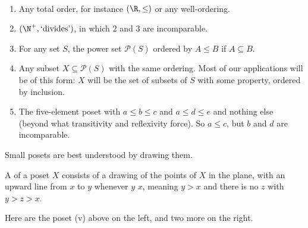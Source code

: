 \begin{example}[Posets]~
  \begin{enumerate}[label=(\roman*)]
    \item Any total order, for instance $(\R, \leq)$ or any well-ordering.
    \item $(\N^+, \text{`divides'})$, in which $2$ and $3$ are incomparable.
    \item For any set $S$, the power set $\mathcal{P}(S)$ ordered by $A \leq B$ if $A \subseteq B$.
    \item Any subset $X \subseteq \mathcal{P}(S)$ with the same ordering. Most of our applications will be of this form: $X$ will be the set of subsets of $S$ with some property, ordered by inclusion.
    \item The five-element poset with $a \leq b \leq c$ and $a \leq d \leq e$ and nothing else (beyond what transitivity and reflexivity force). So $a \leq c$, but $b$ and $d$ are incomparable.
  \end{enumerate}
\end{example}

Small posets are best understood by drawing them.

\begin{definition}
  A  of a poset $X$ consists of a drawing of the points of $X$ in the plane, with an upward line from $x$ to $y$ whenever $y$  $x$, meaning $y > x$ and there is no $z$ with $y > z > x$.
\end{definition}

Here are the poset (v) above on the left, and two more on the right.

